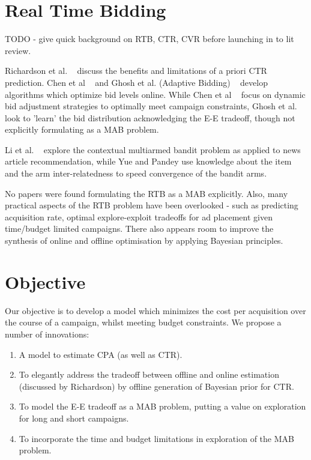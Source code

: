 \documentclass[11pt,a4,singlespacing,titlepagenumber=on]{scrreprt}
\numberwithin{equation}{chapter} %
\theoremstyle{remark}
\begin{document}
\section{Real Time Bidding}

TODO - give quick background on RTB, CTR, CVR before launching in to lit review.

Richardson et al. ~\cite{Richardson:2007:PCE:1242572.1242643} discuss the benefits and limitations of a priori CTR prediction. Chen et al ~\cite{Chen:2011:RBA:2020408.2020604} and Ghosh et al. (Adaptive Bidding) ~\cite{Ghosh:2009:ABD:1526709.1526744} develop algorithms which optimize bid levels online. While Chen et al ~\cite{Chen:2011:RBA:2020408.2020604} focus on dynamic bid adjustment strategies to optimally meet campaign constraints, Ghosh et al. ~\cite{raey} look to 'learn' the bid distribution acknowledging the E-E tradeoff, though not explicitly formulating as a MAB problem.

Li et al. ~\cite{Li:2010:CAP:1772690.1772758} explore the contextual multiarmed bandit problem as applied to news article recommendation, while Yue and Pandey use knowledge about the item and the arm inter-relatedness to speed convergence of the bandit arms.

No papers were found formulating the RTB as a MAB explicitly. Also, many practical aspects of the RTB problem have been overlooked - such as predicting acquisition rate, optimal explore-exploit tradeoffs for ad placement given time/budget limited campaigns. There also appears room to improve the synthesis of online and offline optimisation by applying Bayesian principles.

\section{Objective}
Our objective is to develop a model which minimizes the cost per acquisition over the course of a campaign, whilst meeting budget constraints. We propose a number of innovations:
\begin{enumerate}
	\item A model to estimate CPA (as well as CTR).
	\item To elegantly address the tradeoff between offline and online estimation (discussed by Richardson) by offline generation of Bayesian prior for CTR.
	\item To model the E-E tradeoff as a MAB problem, putting a value on exploration for long and short campaigns.
	\item To incorporate the time and budget limitations in exploration of the MAB problem.
\end{enumerate}
\end{document}
